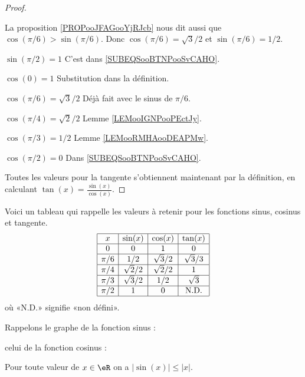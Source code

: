 \begin{proof}
\begin{subproof}
		La proposition \ref{PROPooJFAGooYjRJcb} nous dit aussi que \( \cos(\pi/6)>\sin(\pi/6)\). Donc \( \cos(\pi/6)=\sqrt{ 3 }/2\) et \( \sin(\pi/6)=1/2\).
		\item[$\sin(\pi/2)=1 $] C'est dans \eqref{SUBEQSooBTNPooSvCAHO}.
		\item[$\cos(0)=1 $] Substitution dans la définition.
		\item[$\cos(\pi/6)=\sqrt{ 3 }/2 $] Déjà fait avec le sinus de \( \pi/6\).
		\item[$\cos(\pi/4)=\sqrt{ 2 }/2 $]  Lemme \ref{LEMooIGNPooPEctJy}.
		\item[$\cos(\pi/3)=1/2 $] Lemme \ref{LEMooRMHAooDEAPMw}.
		\item[$\cos(\pi/2)=0 $] Dans \eqref{SUBEQSooBTNPooSvCAHO}.
	\end{subproof}
	Toutes les valeurs pour la tangente s'obtiennent maintenant par la définition, en calculant \( \tan(x)=\frac{ \sin(x) }{ \cos(x) }\).
\end{proof}

Voici un tableau qui rappelle les valeurs à retenir pour les fonctions sinus, cosinus et tangente.
\begin{equation}\label{PGooIMQFooTnBdIl}
	\begin{array}[]{|c|c|c|c|}
		\hline
		x     & \sin(x)    & \cos(x)    & \tan(x)     \\
		\hline
		0     & 0          & 1          & 0           \\
		\hline
		\pi/6 & 1/2        & \sqrt{3}/2 & \sqrt{3}/3  \\
		\hline
		\pi/4 & \sqrt{2}/2 & \sqrt{2}/2 & 1           \\
		\hline
		\pi/3 & \sqrt{3}/2 & 1/2        & \sqrt{3}    \\
		\hline
		\pi/2 & 1          & 0          & \text{N.D.} \\
		\hline
	\end{array}
\end{equation}
où «N.D.»  signifie «non défini».

Rappelons le graphe de la fonction sinus :
\begin{center}
	
\end{center}
celui de la fonction cosinus :
\begin{center}
	
\end{center}


\begin{lemma}
	Pour toute valeur de $x\in \eR$ on a $|\sin(x)|\leq |x|$.
\end{lemma}

